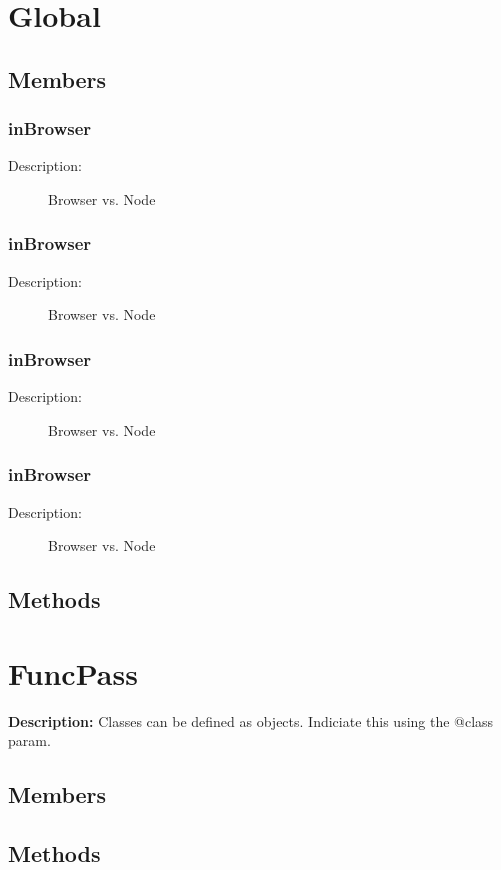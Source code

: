 \section{Global} 
\subsection{Members} 
\subsubsection{inBrowser} 
\begin{description} 
\item[Description:]Browser vs. Node
\end{description} 
\subsubsection{inBrowser} 
\begin{description} 
\item[Description:]Browser vs. Node
\end{description} 
\subsubsection{inBrowser} 
\begin{description} 
\item[Description:]Browser vs. Node
\end{description} 
\subsubsection{inBrowser} 
\begin{description} 
\item[Description:]Browser vs. Node
\end{description} 
\subsection{Methods} 
\section{FuncPass} 
\textbf{Description: }Classes can be defined as objects. Indiciate this using the @class param.
\subsection{Members} 
\subsection{Methods} 
